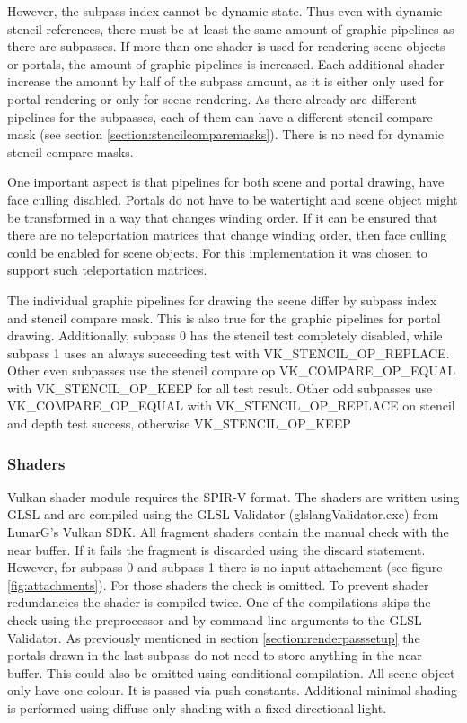 However, the subpass index cannot be dynamic state. Thus even with dynamic stencil references, there must be at least the same amount of graphic pipelines as there are subpasses. If more than one shader is used for rendering scene objects or portals, the amount of graphic pipelines is increased. Each additional shader increase the amount by half of the subpass amount, as it is either only used for portal rendering or only for scene rendering. As there already are different pipelines for the subpasses, each of them can have a different stencil compare mask (see section \ref{section:stencilcomparemasks}). There is no need for dynamic stencil compare masks.

One important aspect is that pipelines for both scene and portal drawing, have face culling disabled. Portals do not have to be watertight and scene object might be transformed in a way that changes winding order. If it can be ensured that there are no teleportation matrices that change winding order, then face culling could be enabled for scene objects. For this implementation it was chosen to support such teleportation matrices.

The individual  graphic pipelines for drawing the scene differ by subpass index and stencil compare mask. This is also true for the graphic pipelines for portal drawing. Additionally, subpass 0 has the stencil test completely disabled, while subpass 1 uses an always succeeding test with VK\_STENCIL\_OP\_REPLACE. Other even subpasses use the stencil compare op VK\_COMPARE\_OP\_EQUAL with VK\_STENCIL\_OP\_KEEP for all test result. Other odd subpasses use VK\_COMPARE\_OP\_EQUAL with VK\_STENCIL\_OP\_REPLACE on stencil and depth test success, otherwise VK\_STENCIL\_OP\_KEEP

\subsubsection{Shaders}
Vulkan shader module requires the SPIR-V format. The shaders are written using GLSL and are compiled using the GLSL Validator (glslangValidator.exe) from LunarG's Vulkan SDK. All fragment shaders contain the manual check with the near buffer. If it fails the fragment is discarded using the discard statement. However, for subpass 0 and subpass 1 there is no input attachement (see figure \ref{fig:attachments}). For those shaders the check is omitted. To prevent shader redundancies the shader is compiled twice. One of the compilations skips the check using the preprocessor and by command line arguments to the GLSL Validator. As previously mentioned in section \ref{section:renderpasssetup} the portals drawn in the last subpass do not need to store anything in the near buffer. This could also be omitted using conditional compilation. All scene object only have one colour. It is passed via push constants. Additional minimal shading is performed using diffuse only shading with a fixed directional light.

